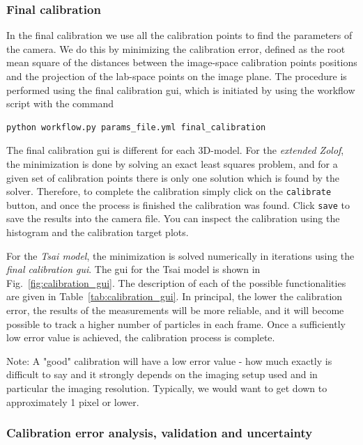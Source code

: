\documentclass[10pt,a4paper]{article}
\begin{document}
\subsubsection{Final calibration}

In the final calibration we use all the calibration points to find the parameters of the camera. We do this by minimizing the calibration error, defined as the root mean square of the distances between the image-space calibration points positions and the projection of the lab-space points on the image plane.
The procedure is performed using the final calibration gui, which is initiated by using the workflow script with the command
%
\begin{verbatim}
python workflow.py params_file.yml final_calibration
\end{verbatim}
%



The final calibration gui is different for each 3D-model.
For the \textit{extended Zolof}, the minimization is done by solving an exact least squares problem, and for a given set of calibration points there is only one solution which is found by the solver. Therefore, to complete the calibration simply click on the \texttt{calibrate} button, and once the process is finished the calibration was found. Click \texttt{save} to save the results into the camera file. You can inspect the calibration using the histogram and the calibration target plots. 


For the \textit{Tsai model}, the minimization is solved numerically in iterations using the \textit{final calibration gui}. 
The gui for the Tsai model is shown in Fig.~\ref{fig:calibration_gui}. The description of each of the possible functionalities are given in Table~\ref{tab:calibration_gui}. In principal, the lower the calibration error, the results of the measurements will be more reliable, and it will become possible to track a higher number of particles in each frame. Once a sufficiently low error value is achieved, the calibration process is complete. 



Note: A "good" calibration will have a low error value - how much exactly is difficult to say and it strongly depends on the imaging setup used and in particular the imaging resolution. Typically, we would want to get down to approximately 1 pixel or lower.  





\subsubsection{Calibration error analysis, validation and uncertainty}
\end{document}
